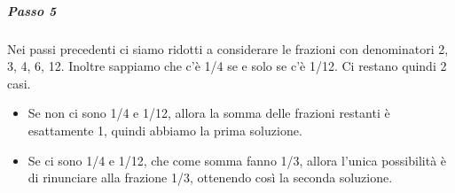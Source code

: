 {\subparagraph{\textmd{Passo 5}}

Nei passi precedenti ci siamo ridotti a considerare le frazioni con denominatori 2, 3, 4, 6, 12.  Inoltre sappiamo che c'è 1/4 se e solo se c'è 1/12.  Ci restano quindi 2 casi.
\begin{itemize}
	\item  Se non ci sono 1/4 e 1/12, allora la somma delle frazioni restanti è esattamente 1, quindi abbiamo la prima soluzione.

	\item  Se ci sono 1/4 e 1/12, che come somma fanno 1/3, allora l'unica possibilità è di rinunciare alla frazione 1/3, ottenendo così la seconda soluzione.
\end{itemize}


}

\renewcommand{\SoluzioniAlternative}{}

\renewcommand{\Osservazioni}{}

\renewcommand{\Commenti}{
}